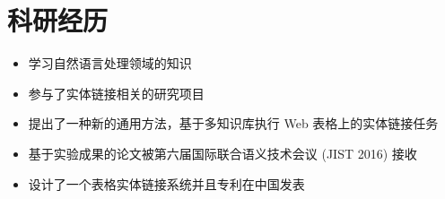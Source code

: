 \section{科研经历}
\begin{itemize}
  \item 学习自然语言处理领域的知识
  \item 参与了实体链接相关的研究项目
\end{itemize}

\begin{itemize}
  \item 提出了一种新的通用方法，基于多知识库执行 Web 表格上的实体链接任务
  \item 基于实验成果的论文被第六届国际联合语义技术会议 (JIST 2016) 接收
  \item 设计了一个表格实体链接系统并且专利在中国发表
\end{itemize}
